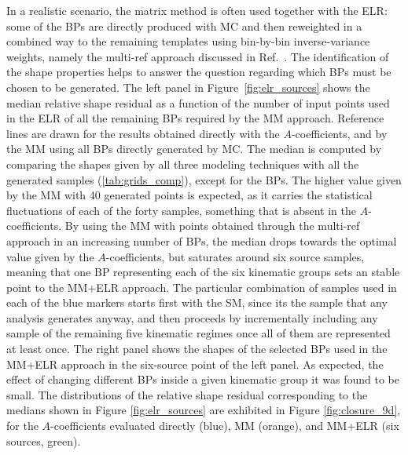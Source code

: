 In a realistic scenario, the matrix method is often used together with the ELR: some of the BPs are directly produced with MC and then reweighted in a combined way to the remaining templates using bin-by-bin inverse-variance weights, namely the multi-ref approach discussed in Ref.~\cite{ELR_R5}. The identification of the shape properties helps to answer the question regarding which BPs must be chosen to be generated. The left panel in Figure~\ref{fig:elr_sources} shows the median relative shape residual as a function of the number of input points used in the ELR of all the remaining BPs required by the MM approach. Reference lines are drawn for the results obtained directly with the $A$-coefficients, and by the MM using all BPs directly generated by MC. The median is computed by comparing the shapes given by all three modeling techniques with all the generated samples (\ref{tab:grids_comp}), except for the BPs. The higher value given by the MM with 40 generated points is expected, as it carries the statistical fluctuations of each of the forty samples, something that is absent in the $A$-coefficients. By using the MM with points obtained through the multi-ref approach in an increasing number of BPs, the median drops towards the optimal value given by the $A$-coefficients, but saturates around six source samples, meaning that one BP representing each of the six kinematic groups sets an stable point to the MM+ELR approach. The particular combination of samples used in each of the blue markers starts first with the SM, since its the sample that any analysis generates anyway, and then proceeds by incrementally including any sample of the remaining five kinematic regimes once all of them are represented at least once. The right panel shows the shapes of the selected BPs used in the MM+ELR approach in the six-source point of the left panel. As expected, the effect of changing different BPs inside a given kinematic group it was found to be small. The distributions of the relative shape residual corresponding to the medians shown in Figure \ref{fig:elr_sources} are exhibited in Figure \ref{fig:closure_9d}, for the $A$-coefficients evaluated directly (blue), MM (orange), and MM+ELR (six sources, green).








